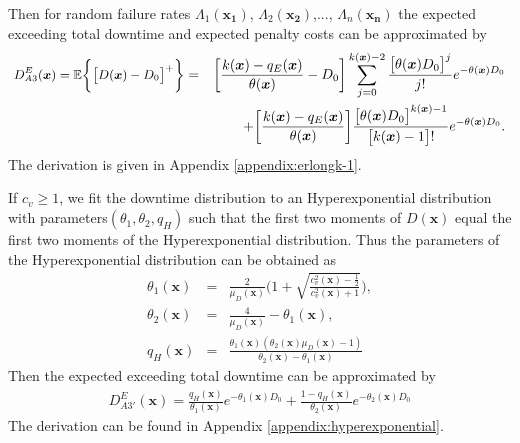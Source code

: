 \documentclass[preprint,12pt]{elsarticle}
\begin{document}
\normalsize
Then for random failure rates $\Lambda_{1}(\boldsymbol{x_{1}})$, $\Lambda_{2}(\boldsymbol{x_{2}})$,..., $\Lambda_{n}(\boldsymbol{x_{n}})$ the expected exceeding total downtime and expected penalty costs can be approximated by
\begin{eqnarray}
\small
D_{A3}^{E}(\boldsymbol{x})=\mathbb{E}\bigg\{\big[D(\boldsymbol{x})-D_{0}\big]^{+}\bigg\}
&=&\bigg[\frac{k(\boldsymbol{x})-q_{E}(\boldsymbol{x})}{\theta(\boldsymbol{x})}-D_{0}\bigg]\sum_{j=0}^{k(\boldsymbol{x})-2}{\frac{\big[\theta(\boldsymbol{x}) D_{0}\big]^j}{j!}e^{-\theta(\boldsymbol{x})D_{0}}}\nonumber\\
&&+\bigg[\frac{k(\boldsymbol{x})-q_{E}(\boldsymbol{x})}{\theta(\boldsymbol{x})}\bigg]\frac{\big[\theta(\boldsymbol{x})D_{0}\big]^{k(\boldsymbol{x})-1}}{\big[k(\boldsymbol{x})-1\big]!}e^{-\theta(\boldsymbol{x})D_{0}}.
\label{EXD1}
\end{eqnarray}
\normalsize
The derivation is given in Appendix \ref{appendix:erlongk-1}.

If $c_{v} \geq 1$, we fit the downtime distribution to an Hyperexponential distribution with parameters$(\theta_{1},\theta_{2}, q_{H})$ such that the first two moments of $D(\boldsymbol{x})$ equal the first two moments of the Hyperexponential distribution. Thus the parameters of the Hyperexponential distribution can be obtained as
\begin{eqnarray}
     \theta_{1}(\boldsymbol{x}) &=& \frac{2}{\mu_{D}(\boldsymbol{x})}\bigg(1+\sqrt{\frac{c^{2}_{v}(\boldsymbol{x})-\frac{1}{2}}{c^{2}_{v}(\boldsymbol{x})+1}} \bigg), \label{theta11}\\
     \theta_{2}(\boldsymbol{x}) &=& \frac{4}{\mu_{D}(\boldsymbol{x})} - \theta_{1}(\boldsymbol{x}), \label{theta12}\\
     q_{H}(\boldsymbol{x}) &=& \frac{\theta_1(\boldsymbol{x})(\theta_2(\boldsymbol{x})\mu_{D}(\boldsymbol{x})-1)}{\theta_2(\boldsymbol{x}) -\theta_1(\boldsymbol{x})} \label{q2}
\end{eqnarray}
Then the expected exceeding total downtime can be approximated by
\begin{eqnarray}
D_{A3'}^{E}(\boldsymbol{x}) =\frac{q_{H}(\boldsymbol{x})}{\theta_{1}(\boldsymbol{x})} e^{-\theta_{1}(\boldsymbol{x}) D_0 } + \frac{1-q_{H}(\boldsymbol{x})}{\theta_{2}(\boldsymbol{x})} e^{-\theta_{2}(\boldsymbol{x}) D_0} \label{EXD2}
\end{eqnarray}
The derivation can be found in Appendix \ref{appendix:hyperexponential}.
\end{document}

